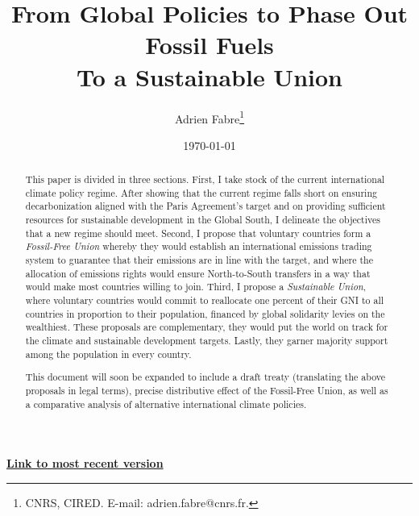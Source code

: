 \documentclass[12pt,english]{article}
\title{From Global Policies to Phase Out Fossil Fuels\\To a Sustainable Union}
\author{Adrien Fabre\footnote{CNRS, CIRED. E-mail: adrien.fabre@cnrs.fr.}}
\date{\today} %
\makeatletter
\renewcommand\tableofcontents{%
    \@starttoc{toc}%
}
\newcommand{\bo}[1]{\textbf{#1}}
\makeatother
\begin{document}
\sloppy
\maketitle

\begin{center}
{\bo{\href{https://github.com/bixiou/global_tax_attitudes/raw/main/paper/global_climate_policies.pdf}{Link to most recent version}}}
\end{center}


\begin{abstract}

This paper is divided in three sections. First, I take stock of the current international climate policy regime. After showing that the current regime falls short on ensuring decarbonization aligned with the Paris Agreement's target and on providing sufficient resources for sustainable development in the Global South, I delineate the objectives that a new regime should meet. Second, I propose that voluntary countries form a \textit{Fossil-Free Union} whereby they would establish an international emissions trading system to guarantee that their emissions are in line with the target, and where the allocation of emissions rights would ensure North-to-South transfers in a way that would make most countries willing to join. Third, I propose a \textit{Sustainable Union}, where voluntary countries would commit to reallocate one percent of their GNI to all countries in proportion to their population, financed by global solidarity levies on the wealthiest. These proposals are complementary, they would put the world on track for the climate and sustainable development targets. Lastly, they garner majority support among the population in every country. 

This document will soon be expanded to include a draft treaty (translating the above proposals in legal terms), precise distributive effect of the Fossil-Free Union, as well as a comparative analysis of alternative international climate policies.

\end{abstract}

\clearpage
\tableofcontents
\end{document}
